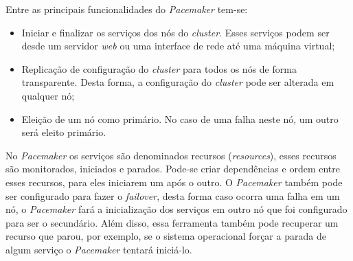 Entre as principais funcionalidades do \textit{Pacemaker} tem-se:
\begin{itemize}
 \item Iniciar e finalizar os serviços dos nós do \textit{cluster}. Esses serviços podem ser desde um servidor \textit{web} ou uma interface de 
 rede até uma máquina virtual;
 \item Replicação de configuração do \textit{cluster} para todos os nós de forma transparente. Desta forma, a configuração do \textit{cluster} 
 pode ser alterada em qualquer nó;
 \item Eleição de um nó como primário. No caso de uma falha neste nó, um outro será eleito primário.
\end{itemize}

No \textit{Pacemaker} os serviços são denominados recursos (\textit{resources}), esses recursos são monitorados, iniciados e parados.
Pode-se criar dependências e ordem entre esses recursos, para eles iniciarem um após o outro. O \textit{Pacemaker} também pode ser configurado
para fazer o \textit{failover}, desta forma caso ocorra uma falha em um nó, o \textit{Pacemaker} fará a inicialização dos serviços em outro nó 
que foi configurado para ser o secundário. Além disso, essa ferramenta também pode recuperar um recurso que parou, por exemplo, se o sistema
operacional forçar a parada de algum serviço o \textit{Pacemaker} tentará iniciá-lo.

